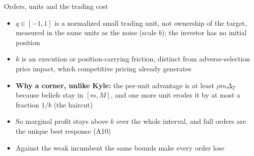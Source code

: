 \documentclass[10pt,aspectratio=169]{beamer}
\newcommand{\NavGap}{\par\vspace{0.45cm}}%
\let\AdapterBackButton\BackButton
\renewcommand{\BackButton}[1]{\NavGap\AdapterBackButton{#1}}%
\begin{document}
\begin{frame}[label=A11]{Orders, units and the trading cost}
\hypertarget{app:orders}{}
\begin{itemize}\setlength{\itemsep}{6pt}
\item $q\in[-1,1]$ is a normalized small trading unit, not ownership of the target, measured in the same units as the noise (scale $b$); the investor has no initial position
\item $k$ is an execution or position-carrying friction, distinct from adverse-selection price impact, which competitive pricing already generates
\item \textbf{Why a corner, unlike Kyle:} the per-unit advantage is at least $\rho m\Delta_T$ because beliefs stay in $[m,M]$, and one more unit erodes it by at most a fraction $1/b$ (the haircut)
\item So marginal profit stays above $k$ over the whole interval, and full orders are the unique best response (A10)
\item Against the weak incumbent the same bounds make every order lose
\end{itemize}
\end{frame}
\end{document}
